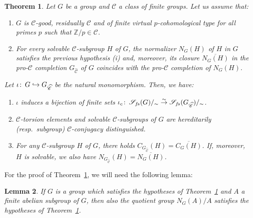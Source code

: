 \documentclass[12pt,twoside]{amsart}
\newcommand\Z{{\mathbb Z}}
\newcommand\hookra{\hookrightarrow}
\newcommand\sr{\stackrel}
\newcommand\ol{\overline}
\newcommand\cC{{\mathscr C}}
\newcommand\cS{{\mathscr S}}
\def\co{\colon\thinspace}
\def\wC{{\widehat{\cC}}}
\newtheorem{theorem}{Theorem}[section]
\newtheorem{lemma}[theorem]{Lemma}
\theoremstyle{definition}
\begin{document}
\begin{theorem}\label{maintheorem} Let $G$ be a group and $\cC$ a class of finite groups. Let us assume that:
\begin{enumerate}
\item $G$ is $\cC$-good, residually $\cC$ and of finite virtual $p$-cohomological type for all primes $p$ such that $\Z/p\in\cC$.
\item For every solvable $\cC$-subgroup $H$ of $G$, the normalizer $N_G(H)$ of $H$ in $G$ satisfies the previous hypothesis (i)
and, moreover, its closure $\ol{N_G(H)}$ in 
the pro-$\cC$ completion $G_{\wC}$ of $G$  coincides with the pro-$\cC$ completion of $N_G(H)$.
\end{enumerate}
Let $\iota\co G\hookra G_{\wC}$ be the natural monomorphism. Then, we have:
\begin{enumerate}
\item $\iota$ induces a bijection of finite sets $\iota_c\co\cS_{f\!s}(G)/_{\sim}\sr{\sim}{\to}\cS_{f\!s}(G_{\wC})/_{\sim}$. 
\item $\cC$-torsion elements and solvable $\cC$-subgroups of $G$ are hereditarily (resp.\ subgroup) $\cC$-conjugacy distinguished.
\item For any $\cC$-subgroup $H$ of $G$, there holds $C_{G_\wC}(H)=\ol{C_G(H)}$. If, moreover, $H$ is solvable,
we also have $N_{G_\wC}(H)=\ol{N_G(H)}$.
\end{enumerate}
\end{theorem}

For the proof of Theorem~\ref{maintheorem}, we will need the following lemma:

\begin{lemma}\label{indtrick}If $G$ is a group which satisfies the hypotheses of Theorem~\ref{maintheorem} and $A$ a finite abelian subgroup 
of $G$, then also the quotient group $N_{G}(A)/A$ satisfies the hypotheses of Theorem~\ref{maintheorem}.
\end{lemma}
\end{document}
